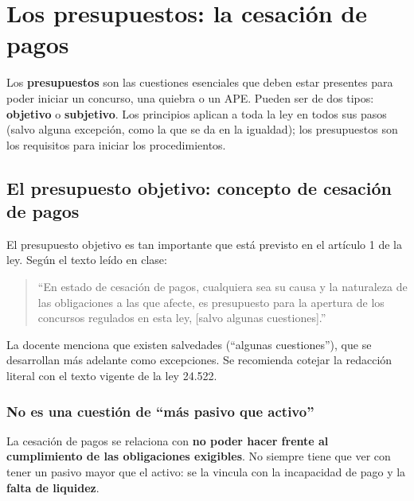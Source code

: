 \documentclass[12pt,oneside]{book}
\begin{document}
\chapter[Presupuesto objetivo]{Los presupuestos: la cesación de pagos}

Los \textbf{presupuestos} son las cuestiones esenciales que deben estar presentes para poder iniciar un concurso, una quiebra o un APE. Pueden ser de dos tipos: \textbf{objetivo} o \textbf{subjetivo}. Los principios aplican a toda la ley en todos sus pasos (salvo alguna excepción, como la que se da en la igualdad); los presupuestos son los requisitos para iniciar los procedimientos.

\section{El presupuesto objetivo: concepto de cesación de pagos}

El presupuesto objetivo es tan importante que está previsto en el artículo 1 de la ley. Según el texto leído en clase:

\begin{quote}
``En estado de cesación de pagos, cualquiera sea su causa y la naturaleza de las obligaciones a las que afecte, es presupuesto para la apertura de los concursos regulados en esta ley, [salvo algunas cuestiones].''
\end{quote}

\begin{note}
La docente menciona que existen salvedades (``algunas cuestiones''), que se desarrollan más adelante como excepciones. Se recomienda cotejar la redacción literal con el texto vigente de la ley 24.522.
\end{note}

\subsection{No es una cuestión de ``más pasivo que activo''}

La cesación de pagos se relaciona con \textbf{no poder hacer frente al cumplimiento de las obligaciones exigibles}. No siempre tiene que ver con tener un pasivo mayor que el activo: se la vincula con la incapacidad de pago y la \textbf{falta de liquidez}.
\end{document}
